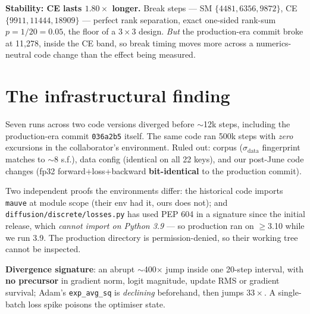 \documentclass[10pt,a4paper]{article}
\newcommand{\code}[1]{\texttt{\small #1}}
\begin{document}
\textbf{Stability: CE lasts $1.80\times$ longer.} Break steps ---
SM $\{4481, 6356, 9872\}$, CE $\{9911, 11444, 18909\}$ --- perfect rank
separation, exact one-sided rank-sum $p=1/20=0.05$, the floor of a $3{\times}3$
design. \emph{But} the production-era commit broke at 11{,}278, inside the CE
band, so break timing moves more across a numerics-neutral code change than the
effect being measured.

\section{The infrastructural finding}
Seven runs across two code versions diverged before $\sim$12k steps, including
the production-era commit \code{036a2b5} itself. The same code ran 500k steps
with \emph{zero} excursions in the collaborator's environment. Ruled out:
corpus ($\sigma_{\text{data}}$ fingerprint matches to $\sim$8 s.f.), data config
(identical on all 22 keys), and our post-June code changes (fp32
forward+loss+backward \textbf{bit-identical} to the production commit).

Two independent proofs the environments differ: the historical code imports
\code{mauve} at module scope (their env had it, ours does not); and
\code{diffusion/discrete/losses.py} has used PEP 604 in a signature since the
initial release, which \emph{cannot import on Python 3.9} --- so production ran
on $\geq$3.10 while we run 3.9. The production directory is permission-denied,
so their working tree cannot be inspected.

\textbf{Divergence signature}: an abrupt $\sim$400$\times$ jump inside one
20-step interval, with \textbf{no precursor} in gradient norm, logit magnitude,
update RMS or gradient survival; Adam's \code{exp\_avg\_sq} is \emph{declining}
beforehand, then jumps $33\times$. A single-batch loss spike poisons the
optimiser state.
\end{document}

